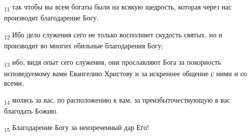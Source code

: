 \begin{tcolorbox}
\textsubscript{11} так чтобы вы всем богаты были на всякую щедрость, которая через нас производит благодарение Богу.
\end{tcolorbox}
\begin{tcolorbox}
\textsubscript{12} Ибо дело служения сего не только восполняет скудость святых, но и производит во многих обильные благодарения Богу;
\end{tcolorbox}
\begin{tcolorbox}
\textsubscript{13} ибо, видя опыт сего служения, они прославляют Бога за покорность исповедуемому вами Евангелию Христову и за искреннее общение с ними и со всеми,
\end{tcolorbox}
\begin{tcolorbox}
\textsubscript{14} молясь за вас, по расположению к вам, за преизбыточествующую в вас благодать Божию.
\end{tcolorbox}
\begin{tcolorbox}
\textsubscript{15} Благодарение Богу за неизреченный дар Его!
\end{tcolorbox}
